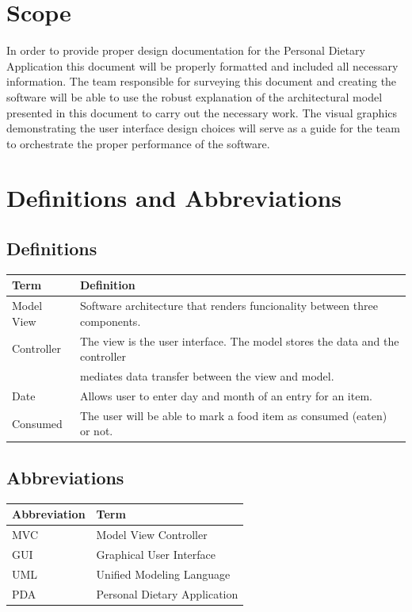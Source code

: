 \documentclass{scrreprt}
\begin{document}
\section{Scope}
In order to provide proper design documentation for the Personal Dietary Application this document will be properly formatted and included all necessary information. The team responsible for surveying this document and creating the software will be able to use the robust explanation of the architectural model presented in this document to carry out the necessary work. The visual graphics demonstrating the user interface design choices will serve as a guide for the team to orchestrate the proper performance of the software.
\section{Definitions and Abbreviations}
\subsection{Definitions}
\begin{tabular}{|l|l|}
\hline
	Term & Definition \\
\hline
	Model View & Software architecture that renders funcionality between three components. \\
	Controller & The view is the user interface. The model stores the data and the controller \\
	& mediates data transfer between the view and model. \\
\hline
	Date & Allows user to enter day and month of an entry for an item. \\
\hline
	Consumed & The user will be able to mark a food item as consumed (eaten) or not. \\
\hline
\end{tabular}

\subsection{Abbreviations}
\begin{tabular}{|l|l|}
\hline
	Abbreviation & Term \\
\hline
	MVC & Model View Controller \\
\hline
	GUI & Graphical User Interface \\
\hline
	UML & Unified Modeling Language \\
\hline
	PDA & Personal Dietary Application \\
\hline
\end{tabular}
\end{document}
